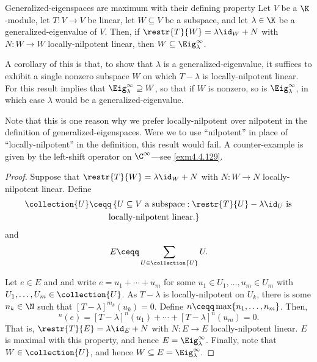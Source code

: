 \begin{prp}{Generalized-eigenspaces are maximum with their defining property}{}
	Let $V$ be a $\K$-module, let $T\colon V\rightarrow V$ be linear, let $W\subseteq V$ be a subspace, and let $\lambda \in \K$ be a generalized-eigenvalue of $V$.  Then, if $\restr{T}{W}=\lambda \id _W+N$ with $N\colon W\rightarrow W$ locally-nilpotent linear, then $W\subseteq \Eig _{\lambda}^{\infty}$.
	\begin{rmk}
		A corollary of this is that, to show that $\lambda$ is a generalized-eigenvalue, it suffices to exhibit a single nonzero subspace $W$ on which $T-\lambda$ is locally-nilpotent linear.  For this result implies that $\Eig _{\lambda}^{\infty}\supseteq W$, so that if $W$ is nonzero, so is $\Eig _{\lambda}^{\infty}$, in which case $\lambda$ would be a generalized-eigenvalue.
	\end{rmk}
	\begin{rmk}
		Note that this is one reason why we prefer locally-nilpotent over nilpotent in the definition of generalized-eigenspaces.  Were we to use ``nilpotent'' in place of ``locally-nilpotent'' in the definition, this result would fail.  A counter-example is given by the left-shift operator on $\C ^{\infty}$---see \cref{exm4.4.129}.
	\end{rmk}
	\begin{proof}
		Suppose that $\restr{T}{W}=\lambda \id _W+N$ with $N\colon W\rightarrow N$ locally-nilpotent linear.  Define
		\begin{equation}
			\begin{split}
				\collection{U} & \ceqq \left\{ U\subseteq V\text{ a subspace}:\restr{T}{U}-\lambda \id _U\text{ is}\right. \\ & \qquad \left. \text{locally-nilpotent linear.}\right\} 
			\end{split}
		\end{equation}
		and
		\begin{equation}
		E\ceqq \sum _{U\in \collection{U}}U.
		\end{equation}
		
		Let $e\in E$ and and write $e=u_1+\cdots +u_m$ for some $u_1\in U_1,\ldots ,u_m\in U_m$ with $U_1,\ldots ,U_m\in \collection{U}$.  As $T-\lambda$ is locally-nilpotent on $U_k$, there is some $n_k\in \N$ such that $[T-\lambda ]^{m_k}(u_k)=0$.  Define $n\ceqq \max \{ n_1,\ldots ,n_m\}$.  Then,
		\begin{equation}
			[T-\lambda ]^n(e)=[T-\lambda ]^n(u_1)+\cdots +[T-\lambda ]^n(u_m)=0.
		\end{equation}
		That is, $\restr{T}{E}=\lambda \id _E+N$ with $N\colon E\rightarrow E$ locally-nilpotent linear.  $E$ is maximal with this property, and hence $E=\Eig _{\lambda}^{\infty}$.  Finally, note that $W\in \collection{U}$, and hence $W\subseteq E=\Eig _{\lambda}^{\infty}$. 
	\end{proof}
\end{prp}
